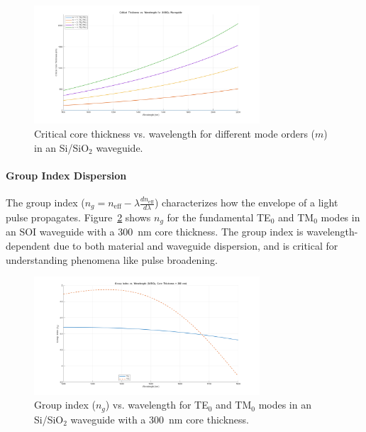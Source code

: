 \documentclass[10pt, a4paper]{article}
\begin{document}
\begin{figure}[h!]
    \centering
    \includegraphics[width=0.75\textwidth]{task1/critical_thickness_vs_wavelength.png}
    \caption{Critical core thickness vs. wavelength for different mode orders ($m$) in an Si/SiO$_2$ waveguide.}
    \label{fig:critical_thickness_vs_wavelength}
\end{figure}

\paragraph{Group Index Dispersion}
The group index ($n_g = n_{\text{eff}} - \lambda \frac{dn_{\text{eff}}}{d\lambda}$) characterizes how the envelope of a light pulse propagates. Figure~\ref{fig:group_index_TE0_TM0_vs_wavelength} shows $n_g$ for the fundamental TE$_0$ and TM$_0$ modes in an SOI waveguide with a 300~nm core thickness. The group index is wavelength-dependent due to both material and waveguide dispersion, and is critical for understanding phenomena like pulse broadening.

\begin{figure}[h!]
    \centering
    \includegraphics[width=0.75\textwidth]{task1/group_index_TE0_TM0_vs_wavelength_d300nm.png}
    \caption{Group index ($n_g$) vs. wavelength for TE$_0$ and TM$_0$ modes in an Si/SiO$_2$ waveguide with a 300~nm core thickness.}
    \label{fig:group_index_TE0_TM0_vs_wavelength}
\end{figure}
\end{document}
